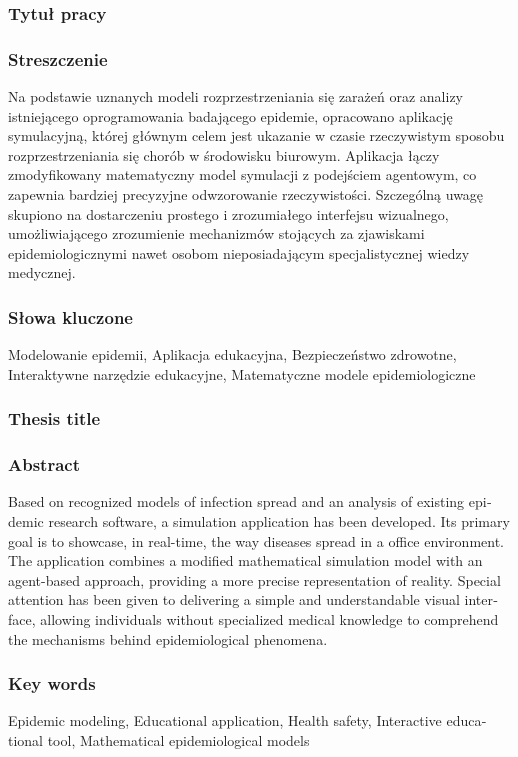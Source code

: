 \subsubsection*{Tytuł pracy} 
\Title

\subsubsection*{Streszczenie}  
Na podstawie uznanych modeli rozprzestrzeniania się zarażeń oraz analizy istniejącego oprogramowania badającego epidemie, opracowano aplikację symulacyjną, której głównym celem jest ukazanie w czasie rzeczywistym sposobu rozprzestrzeniania się chorób w środowisku biurowym. Aplikacja łączy zmodyfikowany matematyczny model symulacji z podejściem agentowym, co zapewnia bardziej precyzyjne odwzorowanie rzeczywistości. Szczególną uwagę skupiono na dostarczeniu prostego i zrozumiałego interfejsu wizualnego, umożliwiającego zrozumienie mechanizmów stojących za  zjawiskami epidemiologicznymi nawet osobom nieposiadającym specjalistycznej wiedzy medycznej.

\subsubsection*{Słowa kluczone}
Modelowanie epidemii,
Aplikacja edukacyjna,
Bezpieczeństwo zdrowotne,
Interaktywne narzędzie edukacyjne,
Matematyczne modele epidemiologiczne

\subsubsection*{Thesis title} 
\begin{otherlanguage}{british}
\TitleAlt
\end{otherlanguage}

\subsubsection*{Abstract} 
\begin{otherlanguage}{british}
Based on recognized models of infection spread and an analysis of existing epidemic research software, a simulation application has been developed. Its primary goal is to showcase, in real-time, the way diseases spread in a office environment. The application combines a modified mathematical simulation model with an agent-based approach, providing a more precise representation of reality. Special attention has been given to delivering a simple and understandable visual interface, allowing individuals without specialized medical knowledge to comprehend the mechanisms behind epidemiological phenomena.
\end{otherlanguage}
\subsubsection*{Key words}  
\begin{otherlanguage}{british}
	Epidemic modeling,
	Educational application,
	Health safety,
	Interactive educational tool,
	Mathematical epidemiological models
\end{otherlanguage}


